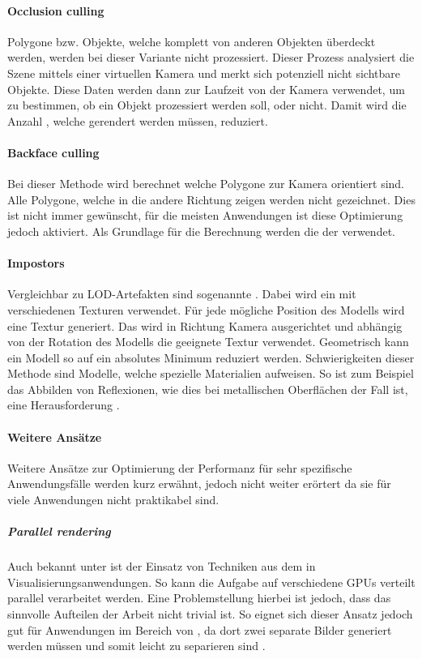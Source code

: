\paragraph{Occlusion culling}
Polygone bzw. Objekte, welche komplett von anderen Objekten überdeckt werden, werden bei dieser Variante nicht prozessiert.
Dieser Prozess analysiert die Szene mittels einer virtuellen Kamera und merkt sich potenziell nicht sichtbare Objekte. Diese Daten werden dann zur Laufzeit von der Kamera verwendet, um zu bestimmen, ob ein Objekt prozessiert werden soll, oder nicht.
Damit wird die Anzahl , welche gerendert werden müssen, reduziert.

\paragraph{Backface culling}
\label{chap:backfaceCulling}
Bei dieser Methode wird berechnet welche Polygone zur Kamera orientiert sind.
Alle Polygone, welche in die andere Richtung zeigen werden nicht gezeichnet.
Dies ist nicht immer gewünscht, für die meisten Anwendungen ist diese Optimierung jedoch aktiviert.
Als Grundlage für die Berechnung werden die  der  verwendet.

\paragraph{Impostors}
Vergleichbar zu LOD-Artefakten sind sogenannte . Dabei wird ein  mit verschiedenen Texturen verwendet. Für jede mögliche Position des Modells wird eine Textur generiert. Das  wird in Richtung Kamera ausgerichtet und abhängig von der Rotation des Modells die geeignete Textur verwendet. Geometrisch kann ein Modell so auf ein absolutes Minimum reduziert werden. Schwierigkeiten dieser Methode sind Modelle, welche spezielle Materialien aufweisen. So ist zum Beispiel das Abbilden von Reflexionen, wie dies bei metallischen Oberflächen der Fall ist, eine Herausforderung \cite{usingImpostors}.

\paragraph{Weitere Ansätze}
Weitere Ansätze zur Optimierung der Performanz für sehr spezifische Anwendungsfälle werden kurz erwähnt, jedoch nicht weiter erörtert da sie für viele Anwendungen nicht praktikabel sind.

\subparagraph{Parallel rendering}
Auch bekannt unter  ist der Einsatz von Techniken aus dem  in Visualisierungsanwendungen. So kann die Aufgabe auf verschiedene GPUs verteilt parallel verarbeitet werden. Eine Problemstellung hierbei ist jedoch, dass das sinnvolle Aufteilen der Arbeit nicht trivial ist. So eignet sich dieser Ansatz jedoch gut für Anwendungen im Bereich von , da dort zwei separate Bilder generiert werden müssen und somit leicht zu separieren sind \cite{parallelRenderingPhd}.

